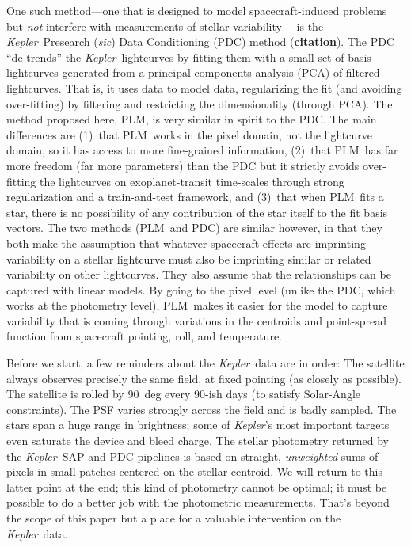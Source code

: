 \documentclass[12pt, preprint]{aastex}
\newcommand{\notenglish}[1]{\textit{#1}}
\newcommand{\sic}{\notenglish{sic}}
\newcommand{\project}[1]{\textsl{#1}}
\newcommand{\Kepler}{\project{Kepler}}
\newcommand{\name}{PLM}
\newcommand{\todo}[1]{\textbf{#1}}
\begin{document}
One such method---one that is designed to model spacecraft-induced problems
  but \emph{not} interfere with measurements of stellar variability---%
  is the \Kepler\ Presearch (\sic) Data Conditioning (PDC) method (\todo{citation}).
The PDC ``de-trends'' the \Kepler\ lightcurves by fitting them with a small set of basis lightcurves
  generated from a principal components analysis (PCA) of filtered lightcurves.
That is, it uses data to model data,
  regularizing the fit (and avoiding over-fitting) by filtering and restricting the dimensionality (through PCA).
The method proposed here, \name, is very similar in spirit to the PDC.
The main differences are
  (1)~that \name\ works in the pixel domain, not the lightcurve domain, so it has access to more fine-grained information,
  (2)~that \name\ has far more freedom (far more parameters) than the PDC
  but it strictly avoids over-fitting the lightcurves on exoplanet-transit time-scales
  through strong regularization and a train-and-test framework, and
  (3)~that when \name\ fits a star, there is no possibility of any contribution of the star itself to the fit basis vectors.
The two methods (\name\ and PDC) are similar however,
  in that they both make the assumption that whatever spacecraft effects are imprinting variability on a stellar lightcurve
  must also be imprinting similar or related variability on other lightcurves.
They also assume that the relationships can be captured with linear models.
By going to the pixel level (unlike the PDC, which works at the photometry level),
  \name\ makes it easier for the model to capture variability
  that is coming through variations in the centroids and point-spread function
  from spacecraft pointing, roll, and temperature.

Before we start, a few reminders about the \Kepler\ data are in order:
The satellite always observes precisely the same field, at fixed pointing (as closely as possible).
The satellite is rolled by 90~deg every 90-ish days (to satisfy Solar-Angle constraints).
The PSF varies strongly across the field and is badly sampled.
The stars span a huge range in brightness;
  some of \Kepler's most important targets even saturate the device and bleed charge.
The stellar photometry returned by the \Kepler\ SAP and PDC pipelines is based on
  straight, \emph{unweighted} sums of pixels in small patches centered on the stellar centroid.
We will return to this latter point at the end;
  this kind of photometry cannot be optimal;
  it must be possible to do a better job with the photometric measurements.
That's beyond the scope of this paper but a place for a valuable intervention on the \Kepler\ data.
\end{document}

